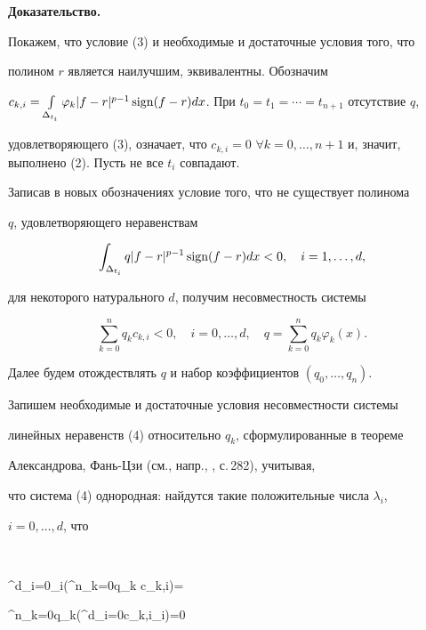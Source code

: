  


{\bf Доказательство.}


Покажем, что условие (3) и необходимые и достаточные условия того, что 


полином $r$ является наилучшим, эквивалентны. Обозначим 


$c_{k,i}=\int\limits_{\Delta_{t_i}}\varphi_k|f-r|^{p-1} 


\sign(f-r)dx$. При $t_0=t_1=\dotsb=t_{n+1}$ отсутствие $q$, 


удовлетворяющего (3), означает, что $c_{k,i}=0$ $\forall 


k=0,\dotsc,n+1$ и, значит, выполнено (2). Пусть не все $t_i$ совпадают. 


 


Записав в новых обозначениях условие того, что не существует полинома 


$q$, удовлетворяющего неравенствам 


$$ 


\int_{\Delta_{t_i}}q|f-r|^{p-1}\sign(f-r)dx<0,\quad 


i=1,\dotsc,d, 


$$ 


для некоторого натурального $d$, получим несовместность системы 


\begin{equation} 


\sum^n_{k=0}q_k c_{k,i}<0,\quad i=0,\dotsc,d,\quad 


q=\sum^n_{k=0}q_k\varphi_k(x). 


\end{equation} 


Далее будем отождествлять $q$ и набор коэффициентов $(q_0,\dotsc,q_n)$. 


Запишем необходимые и достаточные условия несовместности системы 


линейных неравенств (4) относительно $q_k$, сформулированные в теореме 


Александрова, Фань-Цзи (см., напр., \cite{6}, с.\,282), учитывая, 


что система (4) однородная: найдутся такие положительные числа $\lambda_i$, 


$i=0,\dotsc,d$, что 


$$ 


\sum^d_{i=0}\lambda_i\bigg(\sum^n_{k=0}q_k c_{k,i}\bigg)= 


\sum^n_{k=0}q_k\bigg(\sum^d_{i=0}c_{k,i}\lambda_i\bigg)=0 


